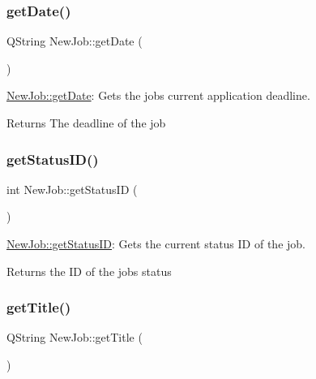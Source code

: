 \subsubsection{\texorpdfstring{get\+Date()}{getDate()}}
{\footnotesize\ttfamily Q\+String New\+Job\+::get\+Date (\begin{DoxyParamCaption}{ }\end{DoxyParamCaption})}



\hyperlink{class_new_job_abe92b6bce4e8e3485f59554a2cbad1bc}{New\+Job\+::get\+Date}\+: Gets the job\textquotesingle{}s current application deadline. 

\begin{DoxyReturn}{Returns}
The deadline of the job 
\end{DoxyReturn}
\mbox{\label{class_new_job_aebbe015a22f5dbf60a34c33dd5c5a8e7}} 
\subsubsection{\texorpdfstring{get\+Status\+I\+D()}{getStatusID()}}
{\footnotesize\ttfamily int New\+Job\+::get\+Status\+ID (\begin{DoxyParamCaption}{ }\end{DoxyParamCaption})}



\hyperlink{class_new_job_aebbe015a22f5dbf60a34c33dd5c5a8e7}{New\+Job\+::get\+Status\+ID}\+: Gets the current status ID of the job. 

\begin{DoxyReturn}{Returns}
the ID of the job\textquotesingle{}s status 
\end{DoxyReturn}
\mbox{\label{class_new_job_aa93c07712d80644b828994a01993c27c}} 
\subsubsection{\texorpdfstring{get\+Title()}{getTitle()}}
{\footnotesize\ttfamily Q\+String New\+Job\+::get\+Title (\begin{DoxyParamCaption}{ }\end{DoxyParamCaption})}



